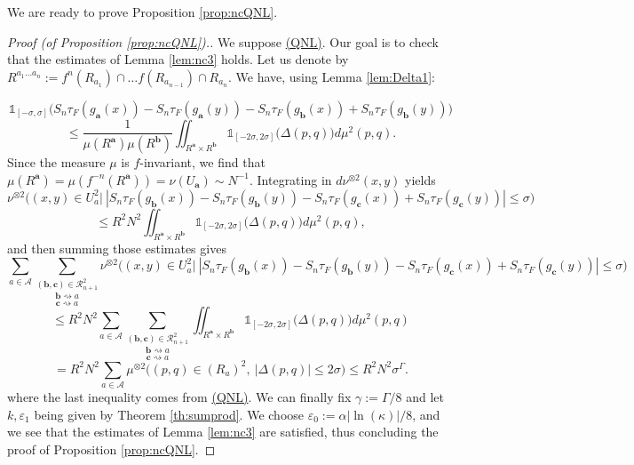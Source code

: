 \documentclass[a4paper]{article}
\theoremstyle{definition}
\begin{document}
We are ready to prove Proposition \ref{prop:ncQNL}.

\begin{proof}[Proof (of Proposition \ref{prop:ncQNL}).]
We suppose \hyperref[QNL]{(QNL)}. Our goal is to check that the estimates of Lemma \ref{lem:nc3} holds. Let us denote by $R^{a_1 \dots a_n} := f^{n}(R_{a_1}) \cap \dots f(R_{a_{n-1}}) \cap R_{a_n}$. We have, using Lemma \ref{lem:Delta1}:

$$\mathbb{1}_{[-\sigma,\sigma]}\Big( S_{n} \tau_F ( g_\mathbf{a}(x)) -  S_{n} \tau_F( g_\mathbf{a}(y)) -  S_{n} \tau_F( g_\mathbf{b}(x)) +  S_{n} \tau_F( g_\mathbf{b}(y)) \Big)$$ $$ \leq \frac{1}{\mu(R^{\mathbf{a}}) \mu(R^{\mathbf{b}})} \iint_{R^{\mathbf{a}} \times R^{\mathbf{b}}} \mathbb{1}_{[-2 \sigma, 2 \sigma] }\Big( \Delta(p,q) \Big) d\mu^2(p,q). $$
Since the measure $\mu$ is $f$-invariant, we find that $\mu(R^{\mathbf{a}}) = \mu(f^{-n}(R^{\mathbf{a}})) = \nu(U_{\mathbf{a}}) \sim N^{-1}$. Integrating in $d\nu^{\otimes 2}(x,y)$ yields
$$ \nu^{\otimes 2}\Big( (x,y) \in U_a^2 \Big| \ |S_{n} \tau_F ( g_\mathbf{b}(x)) -  S_{n} \tau_F( g_\mathbf{b}(y)) -  S_{n} \tau_F( g_\mathbf{c}(x)) +  S_{n} \tau_F( g_\mathbf{c}(y))| \leq \sigma \Big)  $$
$$ \leq R^2 N^2 \iint_{R^{\mathbf{a}} \times R^{\mathbf{b}}} \mathbb{1}_{[-2 \sigma, 2 \sigma] }\Big( \Delta(p,q) \Big) d\mu^2(p,q), $$
and then summing those estimates gives
$$ \sum_{a \in \mathcal{A}}  \underset{\mathbf{c} \rightsquigarrow a}{\underset{\mathbf{b} \rightsquigarrow a}{\sum_{(\mathbf{b},\mathbf{c}) \in \mathcal{R}_{n+1}^2}}} \nu^{\otimes 2}\Big( (x,y) \in U_a^2 \Big| \ |S_{n} \tau_F ( g_\mathbf{b}(x)) -  S_{n} \tau_F( g_\mathbf{b}(y)) -  S_{n} \tau_F( g_\mathbf{c}(x)) +  S_{n} \tau_F( g_\mathbf{c}(y))| \leq \sigma \Big)  $$
$$ \leq R^2 N^2 \sum_{a \in \mathcal{A}}  \underset{\mathbf{c} \rightsquigarrow a}{\underset{\mathbf{b} \rightsquigarrow a}{\sum_{(\mathbf{b},\mathbf{c}) \in \mathcal{R}_{n+1}^2}}} \iint_{R^{\mathbf{a}} \times R^{\mathbf{b}}} \mathbb{1}_{[-2 \sigma, 2 \sigma] }\Big( \Delta(p,q) \Big) d\mu^2(p,q) $$
$$ = R^2 N^2 \sum_{a \in \mathcal{A}} \mu^{\otimes 2}\Big( (p,q) \in (R_a)^2, \  |\Delta(p,q)| \leq 2 \sigma \Big) \leq R^2 N^2 \sigma^{\Gamma} . $$
where the last inequality comes from \hyperref[QNL]{(QNL)}. We can finally fix $\gamma := \Gamma/8$ and let $k,\varepsilon_1$ being given by Theorem \ref{th:sumprod}. 
We choose $\varepsilon_0 := {\alpha |\ln(\kappa)|}/{8} $, and
we see that the estimates of Lemma \ref{lem:nc3} are satisfied, thus concluding the proof of Proposition \ref{prop:ncQNL}. 
\end{proof}
\end{document}
